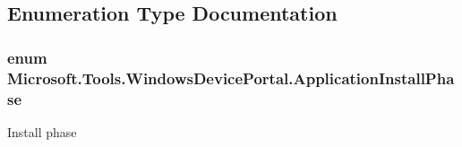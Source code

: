 \subsection{Enumeration Type Documentation}
\subsubsection[{\texorpdfstring{Application\+Install\+Phase}{ApplicationInstallPhase}}]{\setlength{\rightskip}{0pt plus 5cm}enum {\bf Microsoft.\+Tools.\+Windows\+Device\+Portal.\+Application\+Install\+Phase}\hspace{0.3cm}{\ttfamily [strong]}}\hypertarget{namespace_microsoft_1_1_tools_1_1_windows_device_portal_ae5c648e462b3bc9051abfc39ceeb4b69}{}\label{namespace_microsoft_1_1_tools_1_1_windows_device_portal_ae5c648e462b3bc9051abfc39ceeb4b69}


Install phase 

